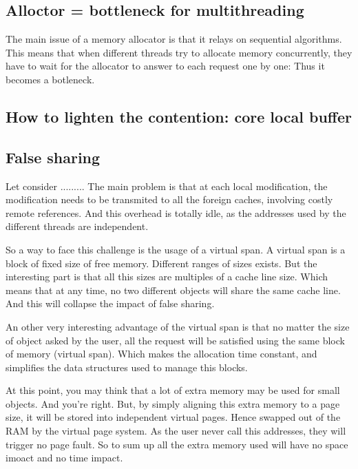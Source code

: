 \documentclass[10pt]{article}											%
\begin{document}
\subsection{Alloctor = bottleneck for multithreading}
	The main issue of a memory allocator is that it relays on sequential algorithms.   This means that when different threads try to allocate memory concurrently, they have to wait for the allocator to answer to each request one by one:   Thus it becomes a botleneck.

\subsection{How to lighten the contention: core local buffer}




\subsection{False sharing}
Let consider .........
The main problem is that at each local modification, the modification needs to be transmited to all the foreign caches, involving costly remote references.   And this overhead is totally idle, as the addresses used by the different threads are independent.

So a way to face this challenge is the usage of a virtual span.   A virtual span is a block of fixed size of free memory.   Different ranges of sizes exists.   But the interesting part is that all this sizes are multiples of a cache line size.   Which means that at any time, no two different objects will share the same cache line.   And this will collapse the impact of false sharing.

An other very interesting advantage of the virtual span is that no matter the size of object asked by the user, all the request will be satisfied using the same block of memory (virtual span).    Which makes the allocation time constant, and simplifies the data structures used to manage this blocks.

At this point, you may think that a lot of extra memory may be used for small objects.   And you're right.   But, by simply aligning this extra memory to a page size, it will be stored into independent virtual pages.   Hence swapped out of the RAM by the virtual page system.   As the user never call this addresses, they will trigger no page fault.
So to sum up all the extra memory used will have no space imoact and no time impact.

\newpage
\end{document}
